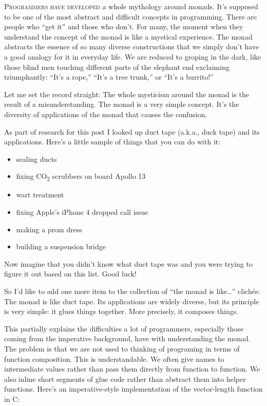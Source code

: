 \lettrine[lhang=0.17]{P}{rogrammers have developed} a whole mythology around monads. It's
supposed to be one of the most abstract and difficult concepts in
programming. There are people who ``get it'' and those who don't. For
many, the moment when they understand the concept of the monad is like a
mystical experience. The monad abstracts the essence of so many diverse
constructions that we simply don't have a good analogy for it in
everyday life. We are reduced to groping in the dark, like those blind
men touching different parts of the elephant end exclaiming
triumphantly: ``It's a rope,'' ``It's a tree trunk,'' or ``It's a
burrito!''

Let me set the record straight: The whole mysticism around the monad is
the result of a misunderstanding. The monad is a very simple concept.
It's the diversity of applications of the monad that causes the
confusion.

As part of research for this post I looked up duct tape (a.k.a., duck
tape) and its applications. Here's a little sample of things that you
can do with it:

\begin{itemize}
\tightlist
\item
  sealing ducts
\item
  fixing CO\textsubscript{2} scrubbers on board Apollo 13
\item
  wart treatment
\item
  fixing Apple's iPhone 4 dropped call issue
\item
  making a prom dress
\item
  building a suspension bridge
\end{itemize}

\noindent
Now imagine that you didn't know what duct tape was and you were trying
to figure it out based on this list. Good luck!

So I'd like to add one more item to the collection of ``the monad is
like\ldots{}'' clichés: The monad is like duct tape. Its applications
are widely diverse, but its principle is very simple: it glues things
together. More precisely, it composes things.

This partially explains the difficulties a lot of programmers,
especially those coming from the imperative background, have with
understanding the monad. The problem is that we are not used to thinking
of programing in terms of function composition. This is understandable.
We often give names to intermediate values rather than pass them
directly from function to function. We also inline short segments of
glue code rather than abstract them into helper functions. Here's an
imperative-style implementation of the vector-length function in C:

